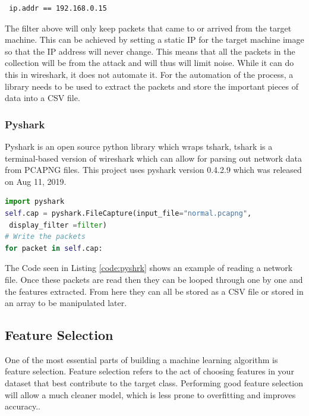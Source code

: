 \begin{verbatim}
 ip.addr == 192.168.0.15
\end{verbatim}

The filter above will only keep packets that came to or arrived from the target machine. This can be achieved by setting a static IP for the target machine image so that the IP address will never change. This means that all the packets in the collection will be from the attack and will thus will limit noise. While it can do this in wireshark, it does not automate it. For the automation of the process, a library needs to be used to extract the packets and store the important pieces of data into a CSV file. 

\subsubsection{Pyshark}
Pyshark is an open source python library which wraps tshark\cite{pyshark}, tshark is a terminal-based version of wireshark which can allow for parsing out network data from PCAPNG files. This project uses pyshark version 0.4.2.9 which was released on Aug 11, 2019.

\begin{lstlisting}[language = python, caption = Pyshark Example Code, label=code:pyshrk]
import pyshark
self.cap = pyshark.FileCapture(input_file="normal.pcapng", 
 display_filter =filter)
# Write the packets
for packet in self.cap:
\end{lstlisting}

The Code seen in Listing \ref{code:pyshrk} shows an example of reading a network file. Once these packets are read then they can be looped through one by one and the features extracted. From here they can all be stored as a CSV file or stored in an array to be manipulated later.

\subsection{Feature Selection}

One of the most essential parts of building a machine learning algorithm is feature selection. Feature selection refers to the act of choosing features in your dataset that best contribute to the target class. Performing good feature selection will allow a much cleaner model, which is less prone to overfitting and improves accuracy.\cite{feat_select}.

